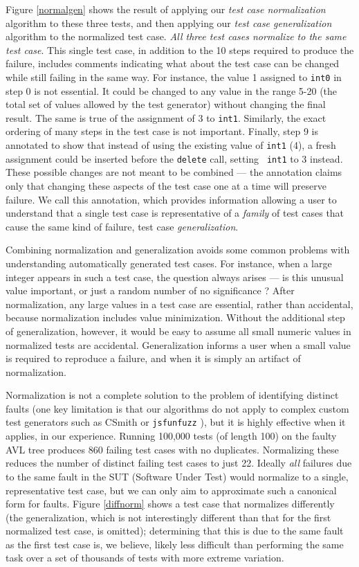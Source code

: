 Figure \ref{normalgen} shows the result of applying our \emph{test case
  normalization} algorithm to these three tests, and then applying our
\emph{test case generalization} algorithm to the normalized test case.
\emph{All three test cases normalize to the same test
case}.  This single test case, in addition to the 10 steps required to produce
the failure, includes comments indicating what about the test case can
be changed while still failing in the same way.  For instance, the
value 1 assigned to {\tt int0} in step 0 is not essential.  It could
be changed to any value in the range 5-20 (the total set of values
allowed by the test generator) without changing the final result.  The
same is true of the assignment of 3 to {\tt int1}.  Similarly, the
exact ordering of many steps in the test case is not important.  Finally,
step 9 is annotated to show that instead of using the existing value
of {\tt int1} (4), a fresh assignment could be inserted before the
{\tt delete} call, setting {\tt
  int1} to 3 instead.  These possible
changes are not meant to be combined --- the annotation claims only
that changing these aspects of the test case one at a time will
preserve failure.  We call this annotation, which provides information
allowing a user to understand that a single test case is
representative of a \emph{family} of test cases that cause the same
kind of failure, test case \emph{generalization}.

Combining normalization and generalization avoids some common problems
with understanding automatically generated test cases.  For instance,
when a large integer appears in such a test case, the question always
arises --- is this unusual value important, or just a random number of
no significance \cite{MakeMost}?  After normalization, any large
values in a test case are essential, rather than
accidental, because normalization includes value minimization.
Without the additional step of generalization, however, it would be
easy to assume all small numeric values in normalized
tests are accidental.  Generalization informs a user when a small
value is required to reproduce a failure, and when it is simply an
artifact of normalization.

Normalization is not a complete solution to the problem of identifying
distinct faults (one key limitation is that our algorithms do not
apply to complex custom test generators such as CSmith \cite{csmith}
or {\tt jsfunfuzz} \cite{jsfunfuzz}), but it is highly effective when
it applies, in our experience.  Running 100,000 tests (of length 100)
on the faulty AVL tree produces 860 failing test cases with no
duplicates.  Normalizing these reduces the number of distinct failing
test cases to just 22.  Ideally \emph{all} failures due to the same
fault in the SUT (Software Under Test) would normalize to a single,
representative test case, but we can only aim to approximate such a
canonical form for faults.  Figure \ref{diffnorm} shows a test case
that normalizes differently (the generalization, which is not
interestingly different than that for the first normalized test case,
is omitted); determining that this is due to the same fault as the
first test case is, we believe, likely less difficult than performing
the same task over a set of thousands of tests with more extreme variation.

